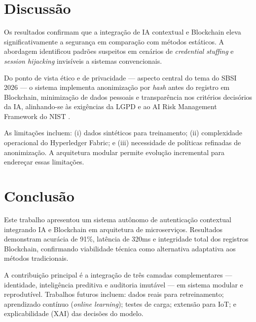 \documentclass[sigconf,nonacm]{acmart}
\begin{document}
\section{Discussão}

Os resultados confirmam que a integração de IA contextual e Blockchain eleva significativamente a segurança em comparação com métodos estáticos. A abordagem identificou padrões suspeitos em cenários de \textit{credential stuffing} e \textit{session hijacking} invisíveis a sistemas convencionais.

Do ponto de vista ético e de privacidade --- aspecto central do tema do SBSI 2026 --- o sistema implementa anonimização por \textit{hash} antes do registro em Blockchain, minimização de dados pessoais e transparência nos critérios decisórios da IA, alinhando-se às exigências da LGPD e ao AI Risk Management Framework do NIST \cite{nist2023ai}.

As limitações incluem: (i) dados sintéticos para treinamento; (ii) complexidade operacional do Hyperledger Fabric; e (iii) necessidade de políticas refinadas de anonimização. A arquitetura modular permite evolução incremental para endereçar essas limitações.

\section{Conclusão}

Este trabalho apresentou um sistema autônomo de autenticação contextual integrando IA e Blockchain em arquitetura de microserviços. Resultados demonstram acurácia de 91\%, latência de 320ms e integridade total dos registros Blockchain, confirmando viabilidade técnica como alternativa adaptativa aos métodos tradicionais.

A contribuição principal é a integração de três camadas complementares --- identidade, inteligência preditiva e auditoria imutável --- em sistema modular e reprodutível. Trabalhos futuros incluem: dados reais para retreinamento; aprendizado contínuo (\textit{online learning}); testes de carga; extensão para IoT; e explicabilidade (XAI) das decisões do modelo.


\end{document}
